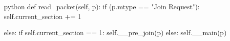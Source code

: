 \begin{mintedbox}{python}
def read_packet(self, p):
    if (p.mtype == "Join Request"):
        self.current_section += 1

    else:
        if self.current_section == 1:
            self.__pre_join(p)
        else:
            self.__main(p)  
\end{mintedbox}